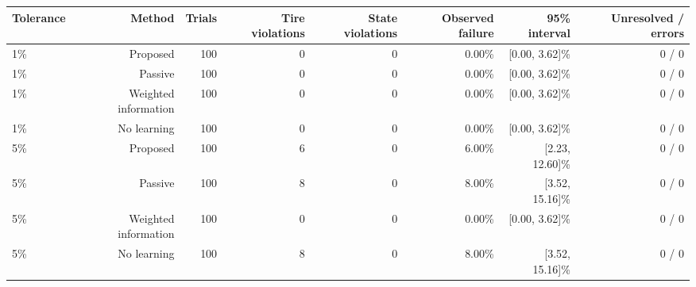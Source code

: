 \begin{tabular}{lrrrrrrr}
\toprule
Tolerance & Method & Trials & Tire violations & State violations & Observed failure & 95\% interval & Unresolved / errors \\
\midrule
1\% & Proposed & 100 & 0 & 0 & 0.00\% & [0.00, 3.62]\% & 0 / 0 \\
1\% & Passive & 100 & 0 & 0 & 0.00\% & [0.00, 3.62]\% & 0 / 0 \\
1\% & Weighted information & 100 & 0 & 0 & 0.00\% & [0.00, 3.62]\% & 0 / 0 \\
1\% & No learning & 100 & 0 & 0 & 0.00\% & [0.00, 3.62]\% & 0 / 0 \\
5\% & Proposed & 100 & 6 & 0 & 6.00\% & [2.23, 12.60]\% & 0 / 0 \\
5\% & Passive & 100 & 8 & 0 & 8.00\% & [3.52, 15.16]\% & 0 / 0 \\
5\% & Weighted information & 100 & 0 & 0 & 0.00\% & [0.00, 3.62]\% & 0 / 0 \\
5\% & No learning & 100 & 8 & 0 & 8.00\% & [3.52, 15.16]\% & 0 / 0 \\
\bottomrule
\end{tabular}
